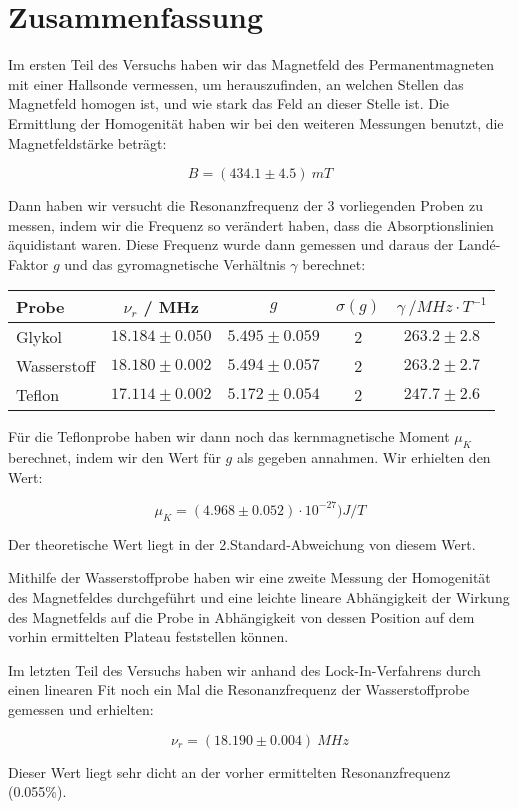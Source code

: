 \clearpage
\section{Zusammenfassung}

Im ersten Teil des Versuchs haben wir das Magnetfeld des Permanentmagneten mit einer Hallsonde vermessen, um herauszufinden, an welchen Stellen das Magnetfeld homogen ist, und wie stark das Feld an dieser Stelle ist. Die Ermittlung der Homogenität haben wir bei den weiteren Messungen benutzt, die Magnetfeldstärke beträgt:

$$ \boxed{B = (434.1 \pm 4.5)\ mT} $$

Dann haben wir versucht die Resonanzfrequenz der 3 vorliegenden Proben zu messen, indem wir die Frequenz so verändert haben, dass die Absorptionslinien äquidistant waren. Diese Frequenz wurde dann gemessen und daraus der Landé-Faktor $g$ und das gyromagnetische Verhältnis $\gamma$ berechnet:


\begin{center}
\begin{tabular}{| l | c | c | c | c |} \hline
Probe & $\nu_r$ / MHz & $g$ & $\sigma(g)$ & $\gamma\ / MHz\cdot T^{-1}$\\ \hline
Glykol & $18.184 \pm 0.050$ & $5.495 \pm 0.059$ & 2 & $263.2 \pm 2.8$ \\
Wasserstoff &$18.180 \pm 0.002$ & $ 5.494 \pm 0.057 $ & 2 & $263.2 \pm 2.7$ \\
Teflon & $17.114 \pm 0.002$ &  $5.172 \pm 0.054$ & 2 & $247.7 \pm 2.6$\\ \hline
\end{tabular}
\end{center}

Für die Teflonprobe haben wir dann noch das kernmagnetische Moment $\mu_K$ berechnet, indem wir den Wert für $g$ als gegeben annahmen. Wir erhielten den Wert:

$$\boxed{\mu_K = (4.968 \pm 0.052)\cdot 10^{-27}) J/T} $$

Der theoretische Wert liegt in der 2.Standard-Abweichung von diesem Wert.

Mithilfe der Wasserstoffprobe haben wir eine zweite Messung der Homogenität des Magnetfeldes durchgeführt und eine leichte lineare Abhängigkeit der Wirkung des Magnetfelds auf die Probe in Abhängigkeit von dessen Position auf dem vorhin ermittelten Plateau feststellen können.

Im letzten Teil des Versuchs haben wir anhand des Lock-In-Verfahrens durch einen linearen Fit noch ein Mal die Resonanzfrequenz der Wasserstoffprobe gemessen und erhielten:

$$\boxed{\nu_r = (18.190 \pm 0.004)\ MHz}$$

Dieser Wert liegt sehr dicht an der vorher ermittelten Resonanzfrequenz (0.055\%).